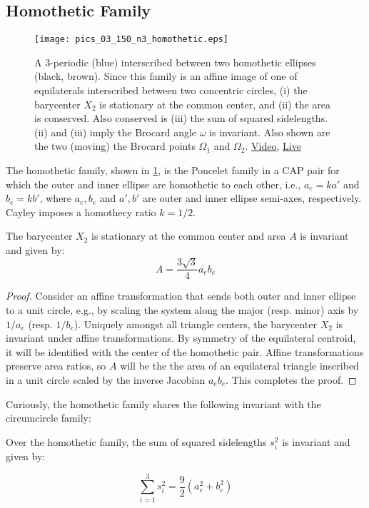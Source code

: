 \subsection{Homothetic Family}
 
\begin{figure}
    \centering
    \texttt{[image: pics\_03\_150\_n3\_homothetic.eps]}
    \caption{A 3-periodic (blue) interscribed between two homothetic ellipses (black, brown). Since this family is an affine image of one of equilaterals interscribed between two concentric circles, (i) the barycenter $X_2$ is stationary at the common center, and (ii) the area is conserved. Also conserved is (iii) the sum of squared sidelengths. (ii) and (iii) imply the Brocard angle $\omega$ is invariant. Also shown are the two (moving) the Brocard points $\Omega_1$ and $\Omega_2$. \href{https://youtu.be/2fvGd8wioZY}{Video}, \href{https://bit.ly/3aYnrVM}{Live}}
    \label{fig:03-homoth-brocard}
\end{figure}

The homothetic family, shown in \cref{fig:03-homoth-brocard}, is the Poncelet family in a CAP pair for which the outer and inner ellipse are homothetic to each other, i.e., $a_e = k a'$ and $b_e = k b'$, where $a_e,b_e$ and $a',b'$ are outer and inner ellipse semi-axes, respectively. Cayley imposes a homothecy ratio $k=1/2$.

\begin{proposition}
The barycenter $X_2$ is stationary at the common center and area $A$ is invariant and given by:
\[A= \frac{3\sqrt{3}}{4} a_e b_e \]
\end{proposition}

\begin{proof}
Consider an affine transformation that sends both outer and inner ellipse to a unit circle, e.g., by scaling the system along the major (resp. minor) axis by $1/a_e$ (resp. $1/b_e$). Uniquely amongst all triangle centers, the barycenter $X_2$ is invariant under affine transformations. By symmetry of the equilateral centroid, it will be identified with the center of the homothetic pair. Affine transformations preserve area ratios, so $A$ will be the the area of an equilateral triangle inscribed in a unit circle scaled by the inverse Jacobian $a_e b_e$. This completes the proof.
\end{proof}

Curiously, the homothetic family shares the following invariant with the circumcircle family:

\begin{proposition}
Over the homothetic family, the sum of squared sidelengths $s_i^2$ is invariant and given by:
	
\[ \sum_{i=1}^3 s_i^2=\frac{9}{2} \left(a_e^{2}+b_e^{2}\right) \]
\end{proposition}


